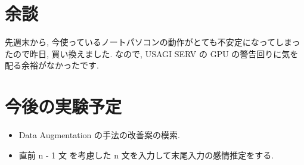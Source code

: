 \documentclass[twocolumn]{jarticle}     %
\begin{document}
\section{余談}
先週末から, 今使っているノートパソコンの動作がとても不安定になってしまったので昨日, 買い換えました.
なので, USAGI SERV の GPU の警告回りに気を配る余裕がなかったです.

\section{今後の実験予定}
\begin{itemize}
  \item Data Augmentation の手法の改善案の模索.
  \item 直前 n - 1 文 を考慮した n 文を入力して末尾入力の感情推定をする.
\end{itemize}



\end{document}
